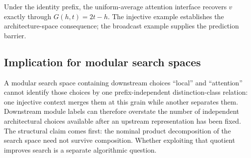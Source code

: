 Under the identity prefix, the uniform-average attention interface recovers $v$ exactly through $G(h,t)=2t-h$. The injective example establishes the architecture-space consequence; the broadcast example supplies the prediction barrier.

\subsection{Implication for modular search spaces}

A modular search space containing downstream choices ``local'' and ``attention'' cannot identify those choices by one prefix-independent distinction-class relation: one injective context merges them at this grain while another separates them. Downstream module labels can therefore overstate the number of independent architectural choices available after an upstream representation has been fixed. The structural claim comes first: the nominal product decomposition of the search space need not survive composition. Whether exploiting that quotient improves search is a separate algorithmic question.
